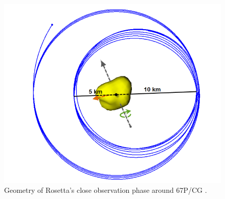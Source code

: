 \begin{figure}[h]
\centering
\captionsetup{justification=centering}
\includegraphics[scale=0.5]{rosettacloseobstraj.png}
\caption{Geometry of Rosetta's close observation phase around 67P/CG \cite{rosettanew2012}.}
\label{fig:rosettacloseobstraj}
\end{figure}

